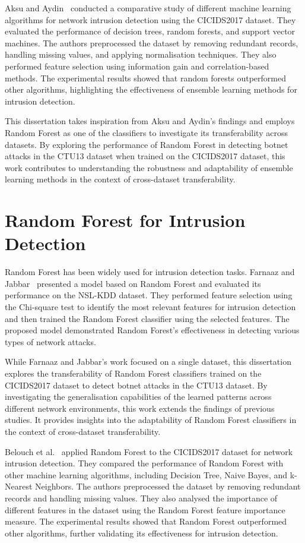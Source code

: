 Aksu and Aydin~\cite{aksu2018detecting} conducted a comparative study of different machine learning algorithms for network intrusion detection using the CICIDS2017 dataset. They evaluated the performance of decision trees, random forests, and support vector machines. The authors preprocessed the dataset by removing redundant records, handling missing values, and applying normalisation techniques. They also performed feature selection using information gain and correlation-based methods. The experimental results showed that random forests outperformed other algorithms, highlighting the effectiveness of ensemble learning methods for intrusion detection.

This dissertation takes inspiration from Aksu and Aydin’s findings and employs Random Forest as one of the classifiers to investigate its transferability across datasets. By exploring the performance of Random Forest in detecting botnet attacks in the CTU13 dataset when trained on the CICIDS2017 dataset, this work contributes to understanding the robustness and adaptability of ensemble learning methods in the context of cross-dataset transferability.

\section{Random Forest for Intrusion Detection}\label{sec:RandomForestIntrusion}

Random Forest has been widely used for intrusion detection tasks. Farnaaz and Jabbar~\cite{farnaaz2016random} presented a model based on Random Forest and evaluated its performance on the NSL-KDD dataset. They performed feature selection using the Chi-square test to identify the most relevant features for intrusion detection and then trained the Random Forest classifier using the selected features. The proposed model demonstrated Random Forest’s effectiveness in detecting various types of network attacks.

While Farnaaz and Jabbar’s work focused on a single dataset, this dissertation explores the transferability of Random Forest classifiers trained on the CICIDS2017 dataset to detect botnet attacks in the CTU13 dataset. By investigating the generalisation capabilities of the learned patterns across different network environments, this work extends the findings of previous studies. It provides insights into the adaptability of Random Forest classifiers in the context of cross-dataset transferability.

Belouch et al.~\cite{belouch2018performance} applied Random Forest to the CICIDS2017 dataset for network intrusion detection. They compared the performance of Random Forest with other machine learning algorithms, including Decision Tree, Naive Bayes, and k-Nearest Neighbors. The authors preprocessed the dataset by removing redundant records and handling missing values. They also analysed the importance of different features in the dataset using the Random Forest feature importance measure. The experimental results showed that Random Forest outperformed other algorithms, further validating its effectiveness for intrusion detection.


